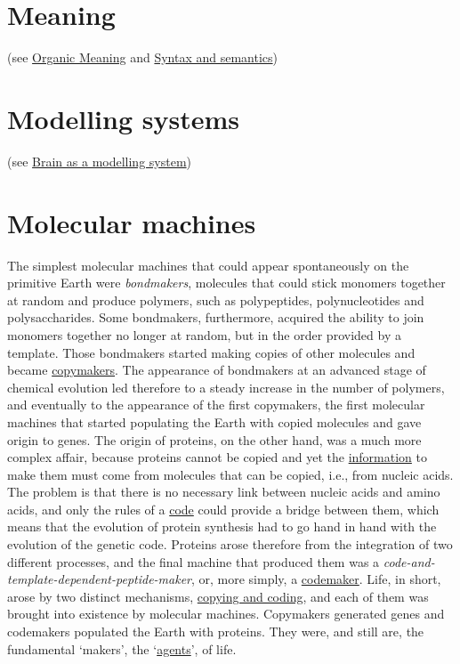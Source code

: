 \documentclass[12pt]{article}
\begin{document}
\hypertarget{meaning}{}
\section{Meaning} (see \hyperlink{organic meaning}{Organic Meaning} and \hyperlink{syntax_and_semantics}{Syntax and semantics})


\hypertarget{modelling_systems}{}
\section{Modelling systems} (see \hyperlink{brain_as_a_modelling_system}{Brain as a modelling system})
 

\hypertarget{molecular_machines}{}
\section{Molecular machines}
The simplest molecular machines that could appear spontaneously on the primitive Earth were \textit{bondmakers}, molecules that could stick monomers together at random and produce polymers, such as polypeptides, polynucleotides and polysaccharides. Some bondmakers, furthermore, acquired the ability to join monomers together no longer at random, but in the order provided by a template. Those bondmakers started making copies of other molecules and became \hyperlink{copymakers}{copymakers}. The appearance of bondmakers at an advanced stage of chemical evolution led therefore to a steady increase in the number of polymers, and eventually to the appearance of the first copymakers, the first molecular machines that started populating the Earth with copied molecules and gave origin to genes. The origin of proteins, on the other hand, was a much more complex affair, because proteins cannot be copied and yet the \hyperlink{organic_information}{information} to make them must come from molecules that can be copied, i.e., from nucleic acids. The problem is that there is no necessary link between nucleic acids and amino acids, and only the rules of a \hyperlink{code}{code} could provide a bridge between them, which means that the evolution of protein synthesis had to go hand in hand with the evolution of the genetic code. Proteins arose therefore from the integration of two different processes, and the final machine that produced them was a \textit{code-and-template-dependent-peptide-maker}, or, more simply, a \hyperlink{codemakers}{codemaker}. Life, in short, arose by two distinct mechanisms, \hyperlink{copying_and_coding}{copying and coding}, and each of them was brought into existence by molecular machines. Copymakers generated genes and codemakers populated the Earth with proteins. They were, and still are, the fundamental `makers', the `\hyperlink{agent}{agents}', of life.
\end{document}
